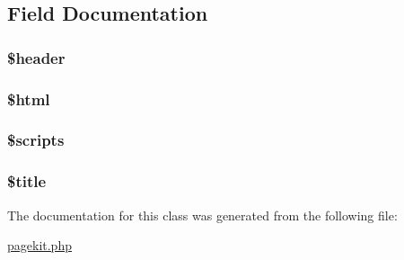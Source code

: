 \subsection{Field Documentation}
\hypertarget{class_h_t_m_l_page_a4f44601f2b9dc8a1644bce53c94ce622}{
\subsubsection[{\$header}]{\setlength{\rightskip}{0pt plus 5cm}\$header\hspace{0.3cm}{\ttfamily [protected]}}}\label{class_h_t_m_l_page_a4f44601f2b9dc8a1644bce53c94ce622}
\hypertarget{class_h_t_m_l_page_a6f96e7fc92441776c9d1cd3386663b40}{
\subsubsection[{\$html}]{\setlength{\rightskip}{0pt plus 5cm}\$html\hspace{0.3cm}{\ttfamily [protected]}}}\label{class_h_t_m_l_page_a6f96e7fc92441776c9d1cd3386663b40}
\hypertarget{class_h_t_m_l_page_a271c9f1463d598b29e28b6642d175365}{
\subsubsection[{\$scripts}]{\setlength{\rightskip}{0pt plus 5cm}\$scripts\hspace{0.3cm}{\ttfamily [protected]}}}\label{class_h_t_m_l_page_a271c9f1463d598b29e28b6642d175365}
\hypertarget{class_h_t_m_l_page_ada57e7bb7c152edad18fe2f166188691}{
\subsubsection[{\$title}]{\setlength{\rightskip}{0pt plus 5cm}\$title\hspace{0.3cm}{\ttfamily [protected]}}}\label{class_h_t_m_l_page_ada57e7bb7c152edad18fe2f166188691}


The documentation for this class was generated from the following file\-:\begin{DoxyCompactItemize}
\item 
\hyperlink{pagekit_8php}{pagekit.\-php}\end{DoxyCompactItemize}
